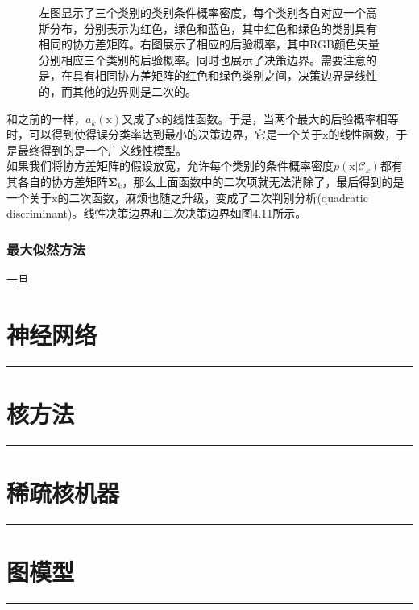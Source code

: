 \documentclass[b5paper]{book}
\renewcommand {\thetable} {\thechapter{}.\arabic{table}}
\renewcommand {\thefigure} {\thechapter{}.\arabic{figure}}
\numberwithin{equation}{chapter}
\newcommand {\bx} {\boldsymbol{\mathrm{x}}}
\newcommand {\bfSigma} {\boldsymbol{\Sigma}}
\newcommand {\calC} {\mathcal{C}}
\begin{document}
{\begin{figure}[ht]
\begin{minipage}[t]{0.5\linewidth}
		\label{fig:4-11b}
		\end{minipage}
		\caption{左图显示了三个类别的类别条件概率密度，每个类别各自对应一个高斯分布，分别表示为红色，绿色和蓝色，其中红色和绿色的类别具有相同的协方差矩阵。右图展示了相应的后验概率，其中RGB颜色矢量分别相应三个类别的后验概率。同时也展示了决策边界。需要注意的是，在具有相同协方差矩阵的红色和绿色类别之间，决策边界是线性的，而其他的边界则是二次的。}
	\end{figure}
	和之前的一样，$a_k(\bx)$又成了$\bx$的线性函数。于是，当两个最大的后验概率相等时，可以得到使得误分类率达到最小的决策边界，它是一个关于$\bx$的线性函数，于是最终得到的是一个广义线性模型。\\
	\indent 如果我们将协方差矩阵的假设放宽，允许每个类别的条件概率密度$p(\bx|\calC_k)$都有其各自的协方差矩阵$\bfSigma_k$，那么上面函数中的二次项就无法消除了，最后得到的是一个关于$\bx$的二次函数，麻烦也随之升级，变成了二次判别分析(quadratic discriminant)。线性决策边界和二次决策边界如图4.11所示。
	}
	\subsection{最大似然方法}
	\textnormal{一旦}

	\chapter{神经网络}
	\noindent\rule[0.25\baselineskip]{\textwidth}{1pt}
	\renewcommand {\thetable} {\thechapter{}.\arabic{table}}
	\renewcommand {\thefigure} {\thechapter{}.\arabic{figure}}
	
	\chapter{核方法}
	\noindent\rule[0.25\baselineskip]{\textwidth}{1pt}
	\renewcommand {\thetable} {\thechapter{}.\arabic{table}}
	\renewcommand {\thefigure} {\thechapter{}.\arabic{figure}}

	\chapter{稀疏核机器}
	\noindent\rule[0.25\baselineskip]{\textwidth}{1pt}
	\renewcommand {\thetable} {\thechapter{}.\arabic{table}}
	\renewcommand {\thefigure} {\thechapter{}.\arabic{figure}}

	\chapter{图模型}
	\noindent\rule[0.25\baselineskip]{\textwidth}{1pt}
	\renewcommand {\thetable} {\thechapter{}.\arabic{table}}
	\renewcommand {\thefigure} {\thechapter{}.\arabic{figure}}
\end{document}
